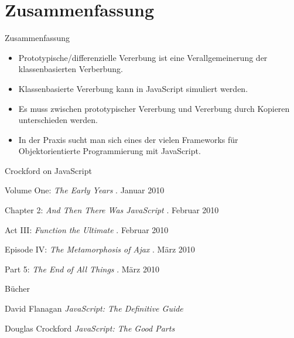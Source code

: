 \section*{Zusammenfassung}

\begin{frame}{Zusammenfassung}
  \begin{itemize}
    \item \alert{Prototypische/differenzielle Vererbung} ist eine \alert{Verallgemeinerung} der
      klassenbasierten Verberbung.
    \item \alert{Klassenbasierte Vererbung} kann in JavaScript \alert{simuliert} werden.
    \item Es muss zwischen \alert{prototypischer Vererbung} und \alert{Vererbung durch
      Kopieren} unterschieden werden.
    \item In der Praxis sucht man sich eines der \alert{vielen Frameworks} für
      \alert{Objektorientierte Programmierung mit JavaScript}.
  \end{itemize} 
\end{frame}

\begin{frame}{Crockford on JavaScript}
  \begin{thebibliography}{1}
     Volume One:
    \emph{The Early Years}
    . Januar 2010
    
     Chapter 2:
    \emph{And Then There Was JavaScript}
    . Februar 2010
    
     Act III:
    \emph{Function the Ultimate}
    . Februar 2010
    
     Episode IV:
    \emph{The Metamorphosis of Ajax}
    . März 2010
    
     Part 5:
    \emph{The End of All Things}
    . März 2010
    
  \end{thebibliography}
\end{frame}

\begin{frame}{Bücher}
  \begin{thebibliography}{1}
     David Flanagan
    \newblock \emph{JavaScript: The Definitive Guide}
    
     Douglas Crockford
    \newblock \emph{JavaScript: The Good Parts}
  \end{thebibliography}
\end{frame}

